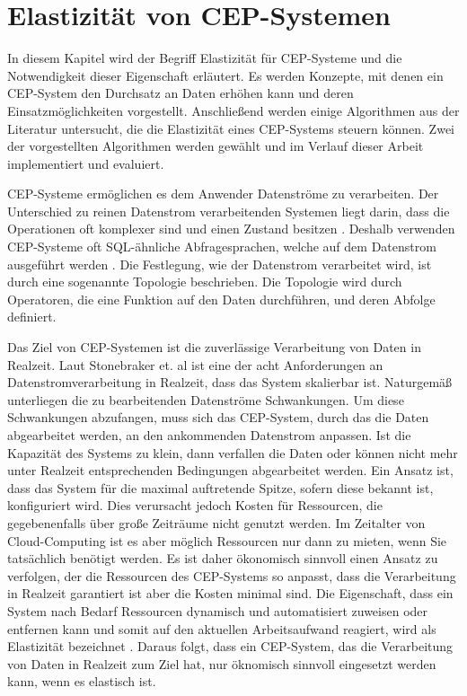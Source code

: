 \chapter{Elastizität von CEP-Systemen}

In diesem Kapitel wird der Begriff Elastizität für CEP-Systeme und die Notwendigkeit dieser Eigenschaft erläutert.
Es werden Konzepte, mit denen ein CEP-System den Durchsatz an Daten erhöhen kann und deren Einsatzmöglichkeiten vorgestellt.
Anschließend werden einige Algorithmen aus der Literatur untersucht, die die Elastizität eines CEP-Systems steuern können.
Zwei der vorgestellten Algorithmen werden gewählt und im Verlauf dieser Arbeit implementiert und evaluiert.

CEP-Systeme ermöglichen es dem Anwender Datenströme zu verarbeiten.
Der Unterschied zu reinen Datenstrom verarbeitenden Systemen liegt darin, dass die Operationen oft komplexer sind und einen Zustand besitzen  \cite{carbone_towards_2013}.
Deshalb verwenden CEP-Systeme oft SQL-ähnliche Abfragesprachen, welche auf dem Datenstrom ausgeführt werden \cite{carbone_towards_2013}.
Die Festlegung, wie der Datenstrom verarbeitet wird, ist durch eine sogenannte Topologie beschrieben.
Die Topologie wird durch Operatoren, die eine Funktion auf den Daten durchführen, und deren Abfolge definiert.

Das Ziel von CEP-Systemen ist die zuverlässige Verarbeitung von Daten in Realzeit.
Laut Stonebraker et. al \cite{stonebraker_8_2005} ist eine der acht Anforderungen an Datenstromverarbeitung in Realzeit, dass das System skalierbar ist.
Naturgemäß unterliegen die zu bearbeitenden Datenströme Schwankungen.
Um diese Schwankungen abzufangen, muss sich das CEP-System, durch das die Daten abgearbeitet werden, an den ankommenden Datenstrom anpassen.
Ist die Kapazität des Systems zu klein, dann verfallen die Daten oder können nicht mehr unter Realzeit entsprechenden Bedingungen abgearbeitet werden.
Ein Ansatz ist, dass das System für die maximal auftretende Spitze, sofern diese bekannt ist, konfiguriert wird.
Dies verursacht jedoch Kosten für Ressourcen, die gegebenenfalls über große Zeiträume nicht genutzt werden.
Im Zeitalter von Cloud-Computing ist es aber möglich Ressourcen nur dann zu mieten, wenn Sie tatsächlich benötigt werden.
Es ist daher ökonomisch sinnvoll einen Ansatz zu verfolgen, der die Ressourcen des CEP-Systems so anpasst, dass die Verarbeitung in Realzeit garantiert ist aber die Kosten minimal sind.
Die Eigenschaft, dass ein System nach Bedarf Ressourcen dynamisch und automatisiert zuweisen oder entfernen kann und somit auf den aktuellen Arbeitsaufwand reagiert, wird als Elastizität bezeichnet \cite{herbst_elasticity_nodate}.
Daraus folgt, dass ein CEP-System, das die Verarbeitung von Daten in Realzeit zum Ziel hat, nur öknomisch sinnvoll eingesetzt werden kann, wenn es elastisch ist.

